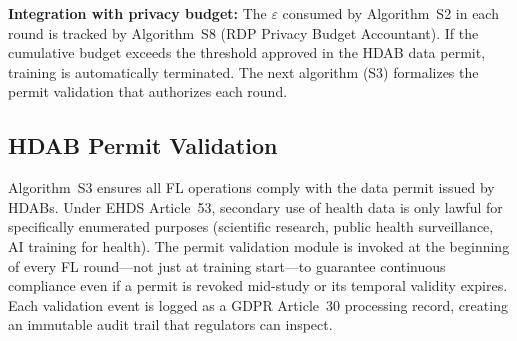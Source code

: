 \documentclass[conference,a4paper]{IEEEtran}
\begin{document}
\begin{figure}[htbp]
\centering
{}
\end{figure}

\textbf{Integration with privacy budget:} The $\varepsilon$ consumed by Algorithm~S2 in each round is tracked by Algorithm~S8 (RDP Privacy Budget Accountant). If the cumulative budget exceeds the threshold approved in the HDAB data permit, training is automatically terminated. The next algorithm (S3) formalizes the permit validation that authorizes each round.

\subsection{HDAB Permit Validation}

Algorithm~S3 ensures all FL operations comply with the data permit issued by HDABs. Under EHDS Article~53, secondary use of health data is only lawful for specifically enumerated purposes (scientific research, public health surveillance, AI training for health). The permit validation module is invoked at the beginning of every FL round---not just at training start---to guarantee continuous compliance even if a permit is revoked mid-study or its temporal validity expires. Each validation event is logged as a GDPR Article~30 processing record, creating an immutable audit trail that regulators can inspect.
\end{document}

